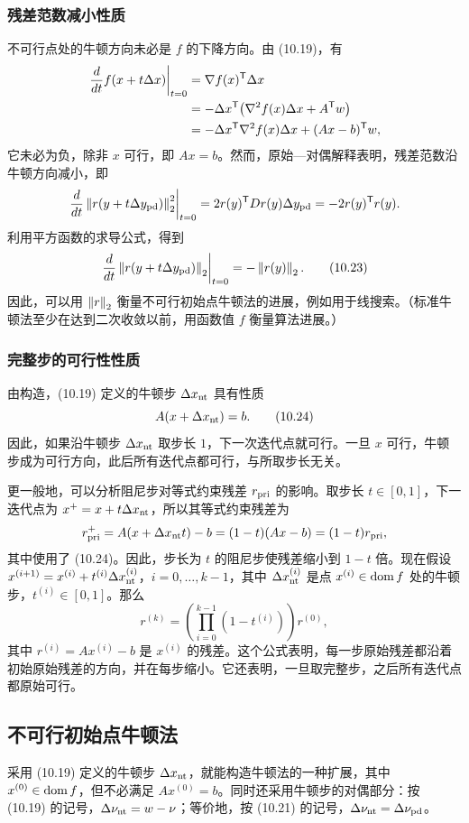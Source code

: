 \subsubsection*{残差范数减小性质}
不可行点处的牛顿方向未必是 $f$ 的下降方向。由 (10.19)，有
\[\begin{aligned}
\left.\frac{d}{dt}f(x+t\Delta x)\right|_{t=0}
&=\nabla f(x)^\mathsf T\Delta x\\
&=-\Delta x^\mathsf T\bigl(\nabla^2f(x)\Delta x+A^\mathsf T w\bigr)\\
&=-\Delta x^\mathsf T\nabla^2f(x)\Delta x+(Ax-b)^\mathsf T w,
\end{aligned}\]
它未必为负，除非 $x$ 可行，即 $Ax=b$。然而，原始—对偶解释表明，残差范数沿牛顿方向减小，即
\[\left.\frac{d}{dt}\left\lVert r(y+t\Delta y_{\rm pd})\right\rVert_2^2\right|_{t=0}=2r(y)^\mathsf T Dr(y)\Delta y_{\rm pd}=-2r(y)^\mathsf T r(y).\]
利用平方函数的求导公式，得到
\begin{equation}\left.\frac{d}{dt}\left\lVert r(y+t\Delta y_{\rm pd})\right\rVert_2\right|_{t=0}=-\left\lVert r(y)\right\rVert_2.\tag{10.23}\end{equation}
因此，可以用 $\left\lVert r\right\rVert_2$ 衡量不可行初始点牛顿法的进展，例如用于线搜索。（标准牛顿法至少在达到二次收敛以前，用函数值 $f$ 衡量算法进展。）

\subsubsection*{完整步的可行性性质}
由构造，(10.19) 定义的牛顿步 $\Delta x_{\rm nt}$ 具有性质
\begin{equation}A(x+\Delta x_{\rm nt})=b.\tag{10.24}\end{equation}
因此，如果沿牛顿步 $\Delta x_{\rm nt}$ 取步长 $1$，下一次迭代点就可行。一旦 $x$ 可行，牛顿步成为可行方向，此后所有迭代点都可行，与所取步长无关。

更一般地，可以分析阻尼步对等式约束残差 $r_{\rm pri}$ 的影响。取步长 $t\in[0,1]$，下一迭代点为 $x^+=x+t\Delta x_{\rm nt}$，所以其等式约束残差为
\[r_{\rm pri}^+=A(x+\Delta x_{\rm nt}t)-b=(1-t)(Ax-b)=(1-t)r_{\rm pri},\]
其中使用了 (10.24)。因此，步长为 $t$ 的阻尼步使残差缩小到 $1-t$ 倍。现在假设 $x^{(i+1)}=x^{(i)}+t^{(i)}\Delta x_{\rm nt}^{(i)}$，$i=0,\ldots,k-1$，其中 $\Delta x_{\rm nt}^{(i)}$ 是点 $x^{(i)}\in\operatorname{dom} f$ 处的牛顿步，$t^{(i)}\in[0,1]$。那么
\[r^{(k)}=\left(\prod_{i=0}^{k-1}(1-t^{(i)})\right)r^{(0)},\]
其中 $r^{(i)}=Ax^{(i)}-b$ 是 $x^{(i)}$ 的残差。这个公式表明，每一步原始残差都沿着初始原始残差的方向，并在每步缩小。它还表明，一旦取完整步，之后所有迭代点都原始可行。

\subsection{不可行初始点牛顿法}
采用 (10.19) 定义的牛顿步 $\Delta x_{\rm nt}$，就能构造牛顿法的一种扩展，其中 $x^{(0)}\in\operatorname{dom} f$，但不必满足 $Ax^{(0)}=b$。同时还采用牛顿步的对偶部分：按 (10.19) 的记号，$\Delta\nu_{\rm nt}=w-\nu$；等价地，按 (10.21) 的记号，$\Delta\nu_{\rm nt}=\Delta\nu_{\rm pd}$。


